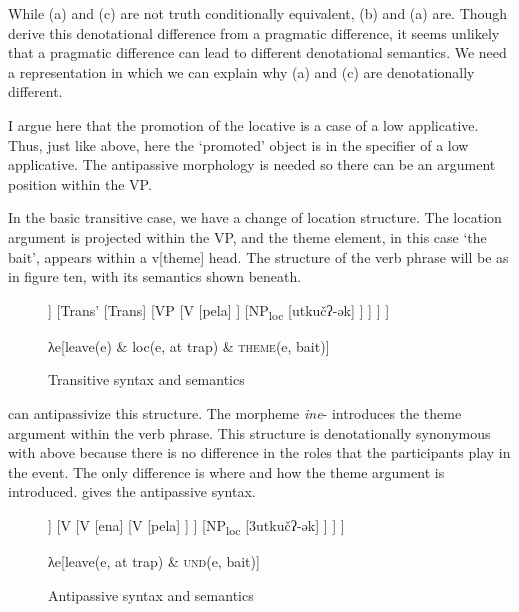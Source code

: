 \documentclass[output=paper,modfonts,nonflat,newtxmath]{langsci/langscibook}
\begin{document}
While (a) and (c) are not truth conditionally equivalent, (b) and (a) are. Though \citet{KozinskyEtAl1988} derive this denotational difference from a pragmatic difference, it seems unlikely that a pragmatic difference can lead to different denotational semantics. We need a representation in which we can explain why (a) and (c) are denotationally different.

I argue here that the promotion of the locative is a case of a low applicative. Thus, just like above, here the ‘promoted’ object is in the specifier of a low applicative. The antipassive morphology is needed so there can be an argument position within the VP.

In the basic transitive case, we have a change of location structure. The location argument is projected within the VP, and the theme element, in this case ‘the bait’, appears within a v[theme] head. The structure of the verb phrase will be as in figure ten, with its semantics shown beneath. 
\begin{figure}
	\begin{forest}
		[TransP
			[NP
				[təkečʔ-ən]
			]
			[Trans'
				[Trans]
				[VP
					[V
						[pela]
					]
					[NP\textsubscript{loc}
						[utkučʔ-ək]
					]
				]
			]
		]
	\end{forest}

λe[leave(e) \& loc(e, at trap) \& \textsc{theme}(e, bait)]
\caption{\label{fig:basilico:10}Transitive syntax and semantics}
\end{figure}
  can antipassivize this structure. The morpheme \textit{ine}{}- introduces the theme argument within the verb phrase. This structure is denotationally synonymous with  above because there is no difference in the roles that the participants play in the event. The only difference is where and how the theme argument is introduced.  gives the antipassive syntax.
\begin{figure}
	\begin{forest}
	[VP
		[NP
			[təkečʔ-a3]
		]
		[V
			[V
				[ena]
				[V
					[pela]
				]
			]
			[NP\textsubscript{loc}
				[3utkučʔ-ək]
			]
		]
	]	
	\end{forest}

	λe[leave(e, at trap) \& \textsc{und}(e, bait)]

	\caption{\label{fig:basilico:11}Antipassive syntax and semantics}
\end{figure}
               
\end{document}
